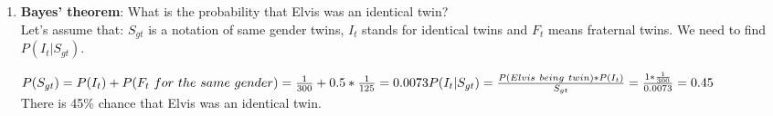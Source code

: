\documentclass[11pt,a4paper,english]{article}
\begin{document}
\begin{enumerate}
      \item {\bf Bayes' theorem}:
        What is the probability that Elvis was an identical twin?\\
        Let's assume that: \begin{math}S_{gt}\end{math} is a notation of same gender twins,
        \begin{math}I_t\end{math} stands for identical twins and \begin{math}F_t\end{math} means
        fraternal twins. We need to find \begin{math}P(I_t|S_{gt})\end{math}.

        \begin{math}
          P(S_{gt}) = P(I_t) + P(F_t\ for\ the\ same\ gender) = \frac{1}{300} + 0.5 * \frac{1}{125} = 0.0073\\
          P(I_t|S_{gt}) = \frac{P(Elvis\ being\ twin) * P(I_t)}{S_{gt}} = \frac{1 * \frac{1}{300}}{0.0073} = 0.45
        \end{math}
        \\
        There is 45\% chance that Elvis was an identical twin.
    \end{enumerate}
\end{document}
